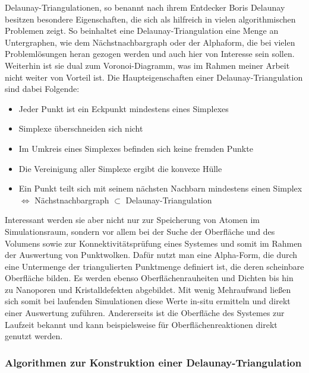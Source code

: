 Delaunay-Triangulationen, so benannt nach ihrem Entdecker Boris Delaunay besitzen besondere Eigenschaften, die sich als hilfreich in vielen algorithmischen Problemen zeigt.
So beinhaltet eine Delaunay-Triangulation eine Menge an Untergraphen, wie dem Nächstnachbargraph oder der Alphaform, die bei vielen Problemlösungen heran gezogen werden und auch hier von Interesse sein sollen.
Weiterhin ist sie dual zum Voronoi-Diagramm, was im Rahmen meiner Arbeit nicht weiter von Vorteil ist.
Die Haupteigenschaften einer Delaunay-Triangulation sind dabei Folgende:

\begin{itemize}
\item Jeder Punkt ist ein Eckpunkt mindestens eines Simplexes
\item Simplexe überschneiden sich nicht
\item Im Umkreis eines Simplexes befinden sich keine fremden Punkte
\item Die Vereinigung aller Simplexe ergibt die konvexe Hülle
\item Ein Punkt teilt sich mit seinem nächsten Nachbarn mindestens einen Simplex \\
  $\Leftrightarrow$ Nächstnachbargraph $\subset$ Delaunay-Triangulation
\end{itemize}

Interessant werden sie aber nicht nur zur Speicherung von Atomen im Simulationsraum, sondern vor allem bei der Suche der Oberfläche und des Volumens sowie zur Konnektivitätsprüfung eines Systemes und somit im Rahmen der Auswertung von Punktwolken.
Dafür nutzt man eine Alpha-Form, die durch eine Untermenge der triangulierten Punktmenge definiert ist, die deren scheinbare Oberfläche bilden.
Es werden ebenso Oberflächenrauheiten und Dichten bis hin zu Nanoporen und Kristalldefekten abgebildet.
Mit wenig Mehraufwand ließen sich somit bei laufenden Simulationen diese Werte in-situ ermitteln und direkt einer Auswertung zuführen.
Andererseits ist die Oberfläche des Systemes zur Laufzeit bekannt und kann beispielsweise für Oberflächenreaktionen direkt genutzt werden.

\subsubsection{Algorithmen zur Konstruktion einer Delaunay-Triangulation}

